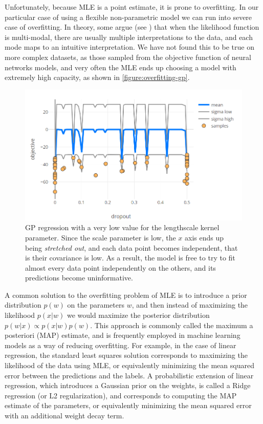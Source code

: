 Unfortunately, because MLE is a point estimate, it is prone to overfitting. In our particular case of using a flexible non-parametric model we can run into severe case of overfitting. In theory, some argue (see \citep{williams2006gaussian}) that when the likelihood function is multi-modal, there are usually multiple interpretations to the data, and each mode maps to an intuitive interpretation. We have not found this to be true on more complex datasets, as those sampled from the objective function of neural networks models, and very often the MLE ends up choosing a model with extremely high capacity, as shown in \autoref{figure:overfitting-gp}.

\begin{figure}
	\begin{center}
		\includegraphics[width=1.0\textwidth]{images/overfitting-gp.png}
		\caption{GP regression with a very low value for the lengthscale kernel parameter. Since the scale parameter is low, the $x$ axis ends up being \emph{stretched out}, and each data point becomes independent, that is their covariance is low. As a result, the model is free to try to fit almost every data point independently on the others, and its predictions become uninformative.}
		\label{figure:overfitting-gp}
	\end{center}
\end{figure}

A common solution to the overfitting problem of MLE is to introduce a prior distribution $p(w)$ on the parameters $w$, and then instead of maximizing the likelihood $p(x|w)$ we would maximize the posterior distribution $p(w | x) \propto p(x | w) p(w)$. This approach is commonly called the maximum a posteriori (MAP) estimate, and is frequently employed in machine learning models as a way of reducing overfitting. For example, in the case of linear regression, the standard least squares solution corresponds to maximizing the likelihood of the data using MLE, or equivalently minimizing the mean squared error between the predictions and the labels. A probabilistic extension of linear regression, which introduces a Gaussian prior on the weights, is called a Ridge regression (or L2 regularization), and corresponds to computing the MAP estimate of the parameters, or equivalently minimizing the mean squared error with an additional weight decay term.

